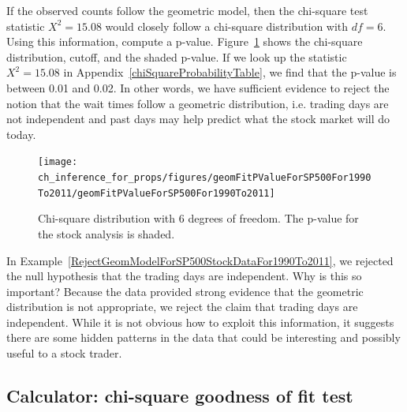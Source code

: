 \begin{example}{If the observed counts follow the geometric model, then the chi-square test statistic $X^2=15.08$ would closely follow a chi-square distribution with $df=6$. Using this information, compute a p-value.} \label{RejectGeomModelForSP500StockDataFor1990To2011}
Figure~\ref{geomFitPValueForSP500For1990To2011} shows the chi-square distribution, cutoff, and the shaded p-value. If we look up the statistic $X^2=15.08$ in Appendix~\ref{chiSquareProbabilityTable}, we find that the p-value is between 0.01 and 0.02. In other words, we have sufficient evidence to reject the notion that the wait times follow a geometric distribution, i.e. trading days are not independent and past days may help predict what the stock market will do today.
\end{example}

\begin{figure}
\centering
\texttt{[image: ch\_inference\_for\_props/figures/geomFitPValueForSP500For1990To2011/geomFitPValueForSP500For1990To2011]}
\caption{Chi-square distribution with 6 degrees of freedom. The p-value for the stock analysis is shaded.}
\label{geomFitPValueForSP500For1990To2011}
\end{figure}

\begin{example}{In Example~\ref{RejectGeomModelForSP500StockDataFor1990To2011}, we rejected the null hypothesis that the trading days are independent. Why is this so important?}
Because the data provided strong evidence that the geometric distribution is not appropriate, we reject the claim that trading days are independent. While it is not obvious how to exploit this information, it suggests there are some hidden patterns in the data that could be interesting and possibly useful to a stock trader.
\end{example}

\subsection{Calculator: chi-square goodness of fit test\vspace{-3mm}}

